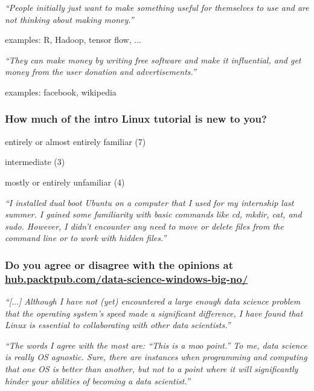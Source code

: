 \documentclass[12pt]{beamer}
\newcommand\ans[1]{{\it ``#1''}}
\newcommand\gap{\vspace{5mm}}
\begin{document}
\begin{frame}
  \ans{People initially just want to make something useful for themselves to use and are not thinking about making money.}

  \gap
  
  examples: R, Hadoop, tensor flow, ...
  
\end{frame}

\begin{frame}

  \ans{They can make money by writing free software and make it influential, and get money from the user donation and advertisements.}

  \gap
  
  examples: facebook, wikipedia
  
\end{frame}

\begin{frame}   %

  \frametitle{How much of the intro Linux tutorial is new to you?}

  entirely or almost entirely familiar (7)

  intermediate (3)
  
  mostly or entirely unfamiliar (4)
  
\end{frame}

\begin{frame}
  \ans{I installed dual boot Ubuntu on a computer that I used for my internship last summer. I gained some familiarity with basic commands like cd, mkdir, cat, and sudo.  However, I didn't encounter any need to move or delete files from the command line or to work with hidden files.}
  
  \end{frame}

\begin{frame} %

  \frametitle{Do you agree or disagree with the opinions at \url{hub.packtpub.com/data-science-windows-big-no/}}


  \ans{[$\dots$] Although  I  have not (yet) encountered a large enough data science problem that the operating system’s speed made a significant difference, I have found that Linux is essential to collaborating with other data scientists.}
  
  \end{frame}

\begin{frame}

  \ans{The words I agree with the most are:  ``This is a moo point.''  To me, data science is really OS agnostic.  Sure, there are instances when programming and computing that one  OS  is  better  than  another,  but  not  to  a  point  where  it  will  significantly  hinder your abilities of becoming a data scientist.}
  
  \end{frame}
\end{document}
